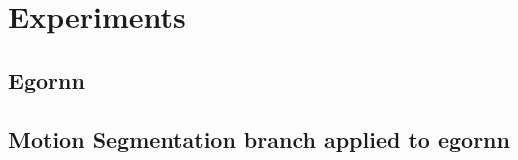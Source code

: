 \documentclass[10pt,twocolumn,hidelinks,letterpaper]{article}
\begin{document}
\section{Experiments}

\subsection{Egornn}

\subsection{Motion Segmentation branch applied to egornn}




{\small


}
\end{document}
